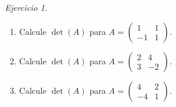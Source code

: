 \documentclass[12pt]{article}
\theoremstyle{remark}
\newtheorem{Ejer}[definicion]{Ejercicio}
\begin{document}
\begin{Ejer}
\begin{enumerate}[start=139]
\item Calcule $\det(A)$ para $A=\begin{pmatrix}1&1\\-1&1\end{pmatrix}$.

\item Calcule $\det(A)$ para $A=\begin{pmatrix}2&4\\3&-2\end{pmatrix}$.

\item Calcule $\det(A)$ para $A=\begin{pmatrix}4&2\\-4&1\end{pmatrix}$.

\end{enumerate}
\end{Ejer}
\end{document}
